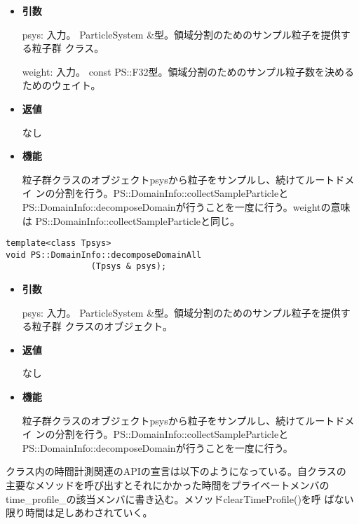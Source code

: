 \begin{itemize}

\item {\bf 引数}

psys: 入力。 ParticleSystem \&型。領域分割のためのサンプル粒子を提供する粒子群
クラス。

weight: 入力。 const PS::F32型。領域分割のためのサンプル粒子数を決める
ためのウェイト。

\item {\bf 返値}

なし

\item {\bf 機能}

粒子群クラスのオブジェクトpsysから粒子をサンプルし、続けてルートドメイ
ンの分割を行う。PS::DomainInfo::collectSampleParticleと
PS::DomainInfo::decomposeDomainが行うことを一度に行う。weightの意味は
PS::DomainInfo::collectSampleParticleと同じ。

\end{itemize}

\begin{screen}
\begin{verbatim}
template<class Tpsys>
void PS::DomainInfo::decomposeDomainAll
                 (Tpsys & psys);
\end{verbatim}
\end{screen}

\begin{itemize}

\item {\bf 引数}

psys: 入力。 ParticleSystem \&型。領域分割のためのサンプル粒子を提供する粒子群
クラスのオブジェクト。

\item {\bf 返値}

なし

\item {\bf 機能}

粒子群クラスのオブジェクトpsysから粒子をサンプルし、続けてルートドメイ
ンの分割を行う。PS::DomainInfo::collectSampleParticleと
PS::DomainInfo::decomposeDomainが行うことを一度に行う。

\end{itemize}



クラス内の時間計測関連のAPIの宣言は以下のようになっている。自クラスの
主要なメソッドを呼び出すとそれにかかった時間をプライベートメンバの
time\_profile\_の該当メンバに書き込む。メソッドclearTimeProfile()を呼
ばない限り時間は足しあわされていく。

